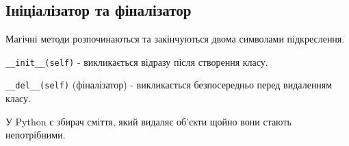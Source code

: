 \subsection{Ініціалізатор та фіналізатор} 
\begin{frame}
Магічні методи розпочинаються та закінчуються двома символами підкреслення.

\texttt{\_\_init\_\_(self)} - викликається відразу після створення класу.

\texttt{\_\_del\_\_(self)} (фіналізатор) - викликається безпосередньо перед видаленням класу. 

У Python є збирач сміття, який видаляє об'єкти щойно вони стають непотрібними.

\end{frame}
